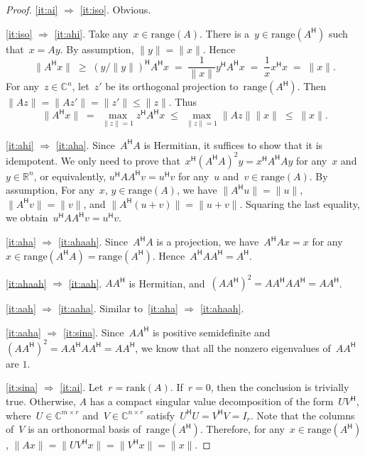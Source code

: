 \documentclass[11pt,a4paper]{article}
\theoremstyle{definition}
\def\real{\mathbb{R}}
\def\CC{\mathbb{C}}
\newcommand{\hmt}{{\scriptscriptstyle{{\mathsf{H}}}}}
\newcommand{\rank}{\mathrm{rank}}
\newcommand{\range}{\mathrm{range}}
\begin{document}
\begin{proof}
  \ref{it:ai} $\Rightarrow $ \ref{it:iso}. Obvious. 

  \ref{it:iso} $\Rightarrow $ \ref{it:ahi}. 
  Take any~$x\in \range(A)$. 
  There is a~$y \in \range(A^\hmt)$ such that~$x=Ay$. By assumption, $\|y\|=\|x\|$. Hence
    \begin{equation*}
      \|A^\hmt x\| \;\ge\; (y/\|y\|)^\hmt A^\hmt x \;=\; \frac{1}{\|x\|} y^\hmt A^\hmt x \;=\;
      \frac{1}{x} x^\hmt x\;=\; \|x\|.
    \end{equation*}
  For any~$z\in\CC^{n}$, let~$z'$ be its orthogonal projection to~$\range(A^\hmt)$. Then~$\|Az\|\!=\!\|Az'\|\!=\!\|z'\|\!\le\!\|z\|$. Thus 
    \begin{equation*}
      \|A^\hmt x\| \;=\; \max_{\|z\|=1}z^\hmt A^\hmt x 
      \;\le\; \max_{\|z\|=1}\|Az\|\|x\| \;\le\; \|x\|.
    \end{equation*}

    \ref{it:ahi} $\Rightarrow $ \ref{it:aha}. Since~$A^\hmt A$ is Hermitian, it suffices to show that it is idempotent. We
      only need to prove that~$x^\hmt(A^\hmt A)^2y=x^\hmt A^\hmt Ay$ for any~$x$ and~$y\in \real^n$,
      or equivalently, $u^\hmt A A^\hmt v=u^\hmt v$ for  any~$u$ and~$v\in \range(A)$. By
      assumption,
      For any~$x$, $y\in\range(A)$, we have $\|A^\hmt u\|=\|u\|$, $\|A^\hmt v\|=\|v\|$, and
      $\|A^\hmt (u+v)\| = \|u+v\|$. Squaring the last equality, we obtain~$u^\hmt AA^\hmt v = u^\hmt
      v$.

      \ref{it:aha} $\Rightarrow$ \ref{it:ahaah}. 
    Since~$A^\hmt A$ is a projection, we have~$A^\hmt A x = x$ for any~$x\in \range(A^\hmt A)
    = \range(A^\hmt)$. Hence~$A^\hmt AA^\hmt = A^\hmt$.

    \ref{it:ahaah} $\Rightarrow$ \ref{it:aah}. $AA^\hmt$ is Hermitian, and~$(AA^\hmt)^2=AA^\hmt AA^\hmt = AA^\hmt$. 

    \ref{it:aah} $\Rightarrow$ \ref{it:aaha}. Similar to~\ref{it:aha} $\Rightarrow$ \ref{it:ahaah}.

    \ref{it:aaha} $\Rightarrow$ \ref{it:sina}. Since~$AA^\hmt$ is positive semidefinite 
    and~$(AA^\hmt)^2=AA^\hmt AA^\hmt =AA^\hmt$, we know that all the nonzero eigenvalues of~$AA^\hmt$ are $1$.

    \ref{it:sina} $\Rightarrow$ \ref{it:ai}. Let~$r=\rank(A)$. If~$r = 0$, then the conclusion is trivially true.
       Otherwise, $A$ has a compact singular value decomposition of the form~$UV^\hmt$,
       where~$U\in\CC^{m\times r}$ and~$V\in\CC^{n\times r}$ satisfy~$U^\hmt U = V^\hmt V = I_r$.
       Note that the columns of~$V$ is an orthonormal basis of~$\range(A^\hmt)$. 
       Therefore, for any~$x\in \range(A^\hmt)$, 
         $\|A x\|= \|UV^\hmt x\| = \|V^\hmt x\| = \|x\|$.
\end{proof}
\end{document}
